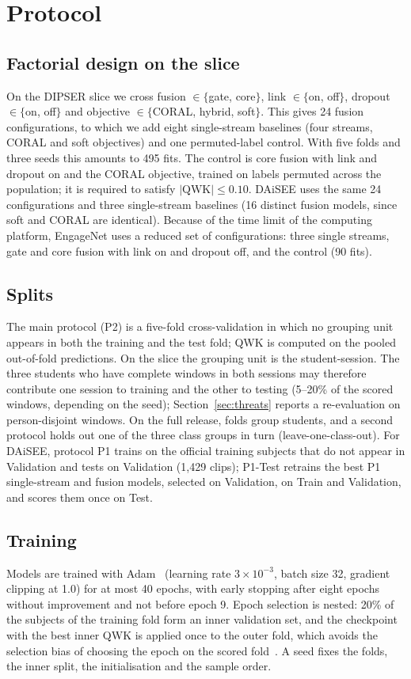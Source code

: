 \section{Protocol}
\label{sec:protocol}

\subsection{Factorial design on the slice}
On the DIPSER slice we cross fusion $\in\{$gate, core$\}$, link $\in\{$on, off$\}$, dropout $\in\{$on, off$\}$ and objective $\in\{$CORAL, hybrid, soft$\}$. This gives 24 fusion configurations, to which we add eight single-stream baselines (four streams, CORAL and soft objectives) and one permuted-label control. With five folds and three seeds this amounts to 495 fits. The control is core fusion with link and dropout on and the CORAL objective, trained on labels permuted across the population; it is required to satisfy $|\mathrm{QWK}|\le0.10$. DAiSEE uses the same 24 configurations and three single-stream baselines (16 distinct fusion models, since soft and CORAL are identical). Because of the time limit of the computing platform, EngageNet uses a reduced set of configurations: three single streams, gate and core fusion with link on and dropout off, and the control (90 fits).

\subsection{Splits}
The main protocol (P2) is a five-fold cross-validation in which no grouping unit appears in both the training and the test fold; QWK is computed on the pooled out-of-fold predictions. On the slice the grouping unit is the student-session. The three students who have complete windows in both sessions may therefore contribute one session to training and the other to testing (5--20\% of the scored windows, depending on the seed); Section~\ref{sec:threats} reports a re-evaluation on person-disjoint windows. On the full release, folds group students, and a second protocol holds out one of the three class groups in turn (leave-one-class-out). For DAiSEE, protocol P1 trains on the official training subjects that do not appear in Validation and tests on Validation (1{,}429 clips); P1-Test retrains the best P1 single-stream and fusion models, selected on Validation, on Train and Validation, and scores them once on Test.

\subsection{Training}
Models are trained with Adam~\cite{kingma2015adam} (learning rate $3\times10^{-3}$, batch size 32, gradient clipping at 1.0) for at most 40 epochs, with early stopping after eight epochs without improvement and not before epoch 9. Epoch selection is nested: 20\% of the subjects of the training fold form an inner validation set, and the checkpoint with the best inner QWK is applied once to the outer fold, which avoids the selection bias of choosing the epoch on the scored fold~\cite{cawley2010overfitting}. A seed fixes the folds, the inner split, the initialisation and the sample order.

